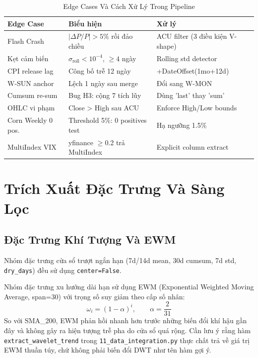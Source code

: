 \documentclass[conference]{IEEEtran}
\begin{document}
\begin{table}[t]
\caption{Edge Cases Và Cách Xử Lý Trong Pipeline}
\label{tab:edge_cases}
\centering
\begin{tabular}{@{}p{1.5cm}p{2.5cm}p{3.5cm}@{}}
\toprule
\textbf{Edge Case} & \textbf{Biểu hiện} & \textbf{Xử lý} \\
\midrule
Flash Crash & $|\Delta P/P| > 5\%$ rồi đảo chiều & ACU filter (3 điều kiện V-shape) \\
Kẹt cảm biến & $\sigma_\text{roll} < 10^{-4}$, $\geq 4$ ngày & Rolling std detector \\
CPI release lag & Công bố trễ 12 ngày & +DateOffset(1mo+12d) \\
W-SUN anchor & Lệch 1 ngày sau merge & Đổi sang W-MON \\
Cumsum re-sum & Bug H3: cộng 7 tích lũy & Dùng 'last' thay 'sum' \\
OHLC vi phạm & Close > High sau ACU & Enforce High/Low bounds \\
Corn Weekly 0 pos. & Threshold 5\%: 0 positives test & Hạ ngưỡng 1.5\% \\
MultiIndex VIX & yfinance $\geq$0.2 trả MultiIndex & Explicit column extract \\
\bottomrule
\end{tabular}
\end{table}

\section{Trích Xuất Đặc Trưng Và Sàng Lọc}

\subsection{Đặc Trưng Khí Tượng Và EWM}

Nhóm đặc trưng cửa sổ trượt ngắn hạn (7d/14d mean, 30d cumsum, 7d std,
\texttt{dry\_days}) đều sử dụng \texttt{center=False}.

Nhóm đặc trưng xu hướng dài hạn sử dụng EWM (Exponential Weighted Moving
Average, span=30) với trọng số suy giảm theo cấp số nhân:
\begin{equation}
\omega_i = (1-\alpha)^i, \qquad \alpha = \frac{2}{31}
\label{eq:ewm}
\end{equation}
So với SMA\_200, EWM phản hồi nhanh hơn trước những biến đổi khí hậu gần đây
và không gây ra hiện tượng trễ pha do cửa sổ quá rộng. Cần lưu ý rằng hàm
\texttt{extract\_wavelet\_trend} trong \texttt{11\_data\_integration.py} thực
chất trả về giá trị EWM thuần túy, chứ không phải biến đổi DWT như tên hàm
gợi ý.
\end{document}

